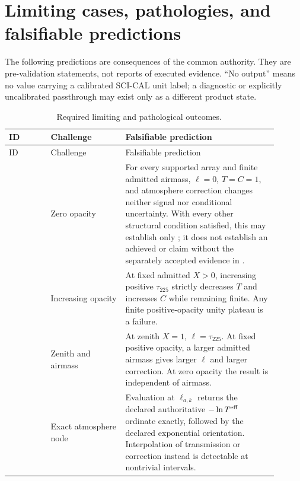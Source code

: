 \section{Limiting cases, pathologies, and falsifiable predictions}
\label{sec:edge-cases}

The following predictions are consequences of the common authority. They are
pre-validation statements, not reports of executed evidence. ``No output''
means no value carrying a calibrated SCI-CAL unit label; a diagnostic or
explicitly uncalibrated passthrough may exist only as a different product
state.

\small
\begin{longtable}{L{0.14\linewidth}L{0.25\linewidth}L{0.51\linewidth}}
\caption{Required limiting and pathological outcomes.}\label{tab:edge-cases}\\
\toprule
ID & Challenge & Falsifiable prediction \\
\midrule
\endfirsthead
\toprule
ID & Challenge & Falsifiable prediction \\
\midrule
\endhead

 & Zero opacity & For every supported array and finite admitted
airmass, \(\ell=0\), \(T=C=1\), and atmosphere correction changes neither
signal nor conditional uncertainty. With every other structural condition
satisfied, this may establish only ; it
does not establish an achieved  or
 claim without the separately accepted evidence in
. \\

 & Increasing opacity & At fixed admitted \(X>0\), increasing
positive \(\tau_{225}\) strictly decreases \(T\) and increases \(C\) while
remaining finite. Any finite positive-opacity unity plateau is a failure. \\

 & Zenith and airmass & At zenith \(X=1\), \(\ell=\tau_{225}\).
At fixed positive opacity, a larger admitted airmass gives larger \(\ell\) and
larger correction. At zero opacity the result is independent of airmass. \\

 & Exact atmosphere node & Evaluation at \(\ell_{a,k}\) returns the
declared authoritative \(-\ln T^{\rm eff}\) ordinate exactly, followed by the
declared exponential orientation. Interpolation of transmission or correction
instead is detectable at nontrivial intervals. \\


\end{longtable}
